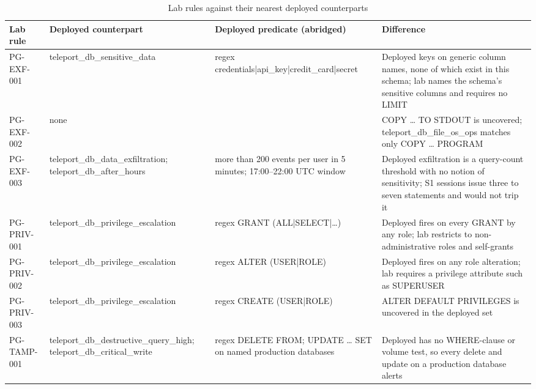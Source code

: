 \begin{table}[H]
\centering
\caption{Lab rules against their nearest deployed counterparts}
\label{tab:app:correspondence}
\scriptsize
\setlength{\tabcolsep}{4pt}
\providecommand{\pcode}[1]{{\ttfamily\hspace{0pt}#1}}
\begin{tabular}{@{}>{\raggedright\arraybackslash}p{1.6cm}>{\raggedright\arraybackslash}p{3.2cm}>{\raggedright\arraybackslash}p{3.7cm}>{\raggedright\arraybackslash}p{5.5cm}@{}}
\toprule
Lab rule & Deployed counterpart & Deployed predicate (abridged) & Difference \\
\midrule
PG-EXF-001 & \pcode{teleport\_\allowbreak{}db\_\allowbreak{}sensitive\_\allowbreak{}data} & regex \pcode{credentials|\allowbreak{}api\_\allowbreak{}key|\allowbreak{}credit\_\allowbreak{}card|\allowbreak{}secret} & Deployed keys on generic column names, none of which exist in this schema; lab names the schema's sensitive columns and requires no \pcode{LIMIT} \\
PG-EXF-002 & none & & \pcode{COPY \dots{} TO STDOUT} is uncovered; \pcode{teleport\_\allowbreak{}db\_\allowbreak{}file\_\allowbreak{}os\_\allowbreak{}ops} matches only \pcode{COPY \dots{} PROGRAM} \\
PG-EXF-003 & \pcode{teleport\_\allowbreak{}db\_\allowbreak{}data\_\allowbreak{}exfiltration}; \pcode{teleport\_\allowbreak{}db\_\allowbreak{}after\_\allowbreak{}hours} & more than 200 events per user in 5 minutes; 17:00--22:00 UTC window & Deployed exfiltration is a query-count threshold with no notion of sensitivity; S1 sessions issue three to seven statements and would not trip it \\
PG-PRIV-001 & \pcode{teleport\_\allowbreak{}db\_\allowbreak{}privilege\_\allowbreak{}escalation} & regex \pcode{GRANT (ALL|\allowbreak{}SELECT|\allowbreak{}\dots)} & Deployed fires on every \pcode{GRANT} by any role; lab restricts to non-administrative roles and self-grants \\
PG-PRIV-002 & \pcode{teleport\_\allowbreak{}db\_\allowbreak{}privilege\_\allowbreak{}escalation} & regex \pcode{ALTER (USER|\allowbreak{}ROLE)} & Deployed fires on any role alteration; lab requires a privilege attribute such as \pcode{SUPERUSER} \\
PG-PRIV-003 & \pcode{teleport\_\allowbreak{}db\_\allowbreak{}privilege\_\allowbreak{}escalation} & regex \pcode{CREATE (USER|\allowbreak{}ROLE)} & \pcode{ALTER DEFAULT PRIVILEGES} is uncovered in the deployed set \\
PG-TAMP-001 & \pcode{teleport\_\allowbreak{}db\_\allowbreak{}destructive\_\allowbreak{}query\_\allowbreak{}high}; \pcode{teleport\_\allowbreak{}db\_\allowbreak{}critical\_\allowbreak{}write} & regex \pcode{DELETE FROM}; \pcode{UPDATE \dots{} SET} on named production databases & Deployed has no \pcode{WHERE}-clause or volume test, so every delete and update on a production database alerts \\

\end{tabular}
\end{table}
